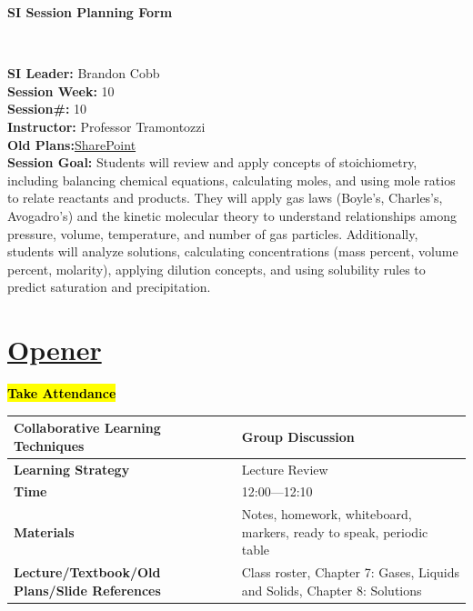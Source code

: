 \documentclass{article}
\begin{document}
\begin{center}
    {\LARGE\textbf{SI Session Planning Form}}
\end{center}

\
\noindent
\begin{flushleft}
\textbf{SI Leader:} Brandon Cobb\\
\textbf{Session Week:} 10\\
\textbf{Session\#:} 10\\
\textbf{Instructor:} Professor Tramontozzi\\
\textbf{Old Plans:}\href{https://macombedu.sharepoint.com/:b:/s/ASC-SupplementalInstructionEmbeddedTutoring/EeSYqCwT_KhMolgJvXbVEjgBOyF_DevvS8BgCm1zPkQQJg?e=QJTt4o}{SharePoint}\\
\textbf{Session Goal:} Students will review and apply concepts of stoichiometry, including balancing chemical equations, calculating moles, and using mole ratios to relate reactants and products. They will apply gas laws (Boyle’s, Charles’s, Avogadro’s) and the kinetic molecular theory to understand relationships among pressure, volume, temperature, and number of gas particles. Additionally, students will analyze solutions, calculating concentrations (mass percent, volume percent, molarity), applying dilution concepts, and using solubility rules to predict saturation and precipitation.
\end{flushleft}

\vspace{1em}
\section*{\underline{Opener}}
{\centering\large\textbf{\hl{Take Attendance}}\par}\vspace{-0.25\baselineskip}
\noindent
\begin{tabular}{|p{4.2cm}|p{9.8cm}|}
\hline
\textbf{Collaborative Learning Techniques} & Group Discussion\\
\hline
\textbf{Learning Strategy} & Lecture Review\\
\hline
\textbf{Time} & 12:00---12:10\\
\hline
\textbf{Materials} & Notes, homework, whiteboard, markers, ready to speak, periodic table \\
\hline
\textbf{Lecture/Textbook/Old Plans/Slide References} & Class roster, Chapter 7: Gases, Liquids and Solids, Chapter 8: Solutions  \\
\hline
\end{tabular}
\end{document}
